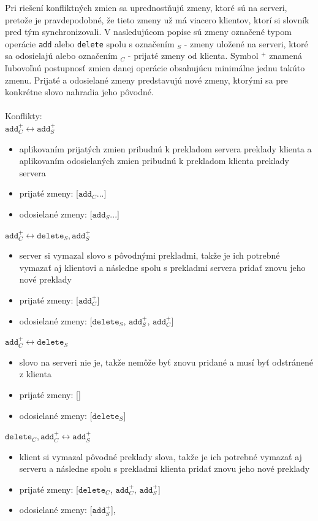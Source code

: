 \documentclass[
  digital, %
  table,   %
  lof,     %
  lot,     %
]{fithesis3}
\begin{document}
Pri riešení konfliktných zmien sa uprednostňujú zmeny, ktoré sú na serveri, pretože je pravdepodobné, že tieto zmeny už má viacero klientov, ktorí si slovník pred tým synchronizovali. V nasledujúcom popise sú zmeny označené typom operácie \texttt{add} alebo \texttt{delete} spolu s označením $_S$ - zmeny uložené na serveri, ktoré sa odosielajú alebo označením $_C$ - prijaté zmeny od klienta. Symbol $^+$ znamená ľubovoľnú postupnosť zmien danej operácie obsahujúcu minimálne jednu takúto zmenu. Prijaté a odosielané zmeny predstavujú nové zmeny, ktorými sa pre konkrétne slovo nahradia jeho pôvodné.
\\
\\
Konflikty:
\\
\noindent
$\texttt{add}_{C}^+ \longleftrightarrow \texttt{add}_{S}^+$
\begin{itemize}
\item aplikovaním prijatých zmien pribudnú k prekladom servera preklady klienta a aplikovaním odosielaných zmien pribudnú k prekladom klienta preklady servera 
\item prijaté zmeny: [$\texttt{add}_{C}...$]
\item odosielané zmeny: [$\texttt{add}_{S}...$] 
\end{itemize}

\noindent
$\texttt{add}_{C}^+ \longleftrightarrow \texttt{delete}_{S}, \texttt{add}_{S}^+$
\begin{itemize}
\item server si vymazal slovo s pôvodnými prekladmi, takže je ich potrebné vymazať aj klientovi a následne spolu s prekladmi servera pridať znovu jeho nové preklady
\item prijaté zmeny: [$\texttt{add}_{C}^+$]
\item odosielané zmeny: [$\texttt{delete}_{S}$, $\texttt{add}_{S}^+$, $\texttt{add}_{C}^+$] 
\end{itemize}

\noindent
$\texttt{add}_{C}^+ \longleftrightarrow \texttt{delete}_{S}$
\begin{itemize}
\item slovo na serveri nie je, takže nemôže byť znovu pridané a musí byť odstránené z klienta
\item prijaté zmeny: []
\item odosielané zmeny: [$\texttt{delete}_{S}$]
\end{itemize}
\noindent
$\texttt{delete}_{C}, \texttt{add}_{C}^+ \longleftrightarrow \texttt{add}_{S}^+$
\begin{itemize}
\item klient si vymazal pôvodné preklady slova, takže je ich potrebné vymazať aj serveru a následne spolu s prekladmi klienta pridať znovu jeho nové preklady
\item prijaté zmeny: [$\texttt{delete}_{C}$, $\texttt{add}_{C}^+$, $\texttt{add}_{S}^+$]
\item odosielané zmeny: [$\texttt{add}_{S}^+$],
\end{itemize}
\end{document}
